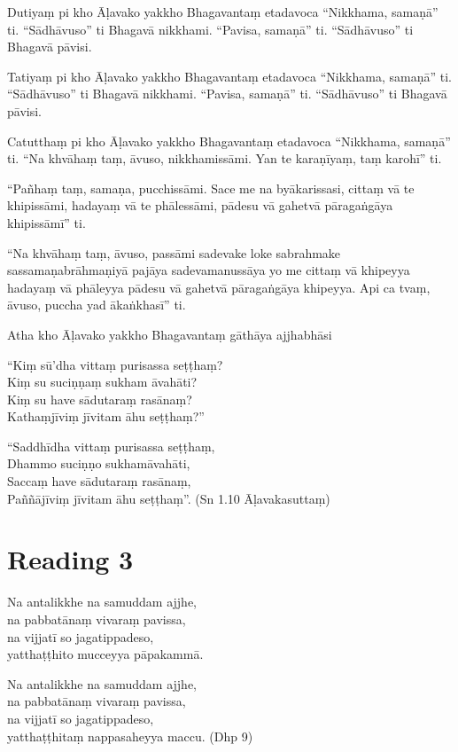 Dutiyaṃ pi kho Āḷavako yakkho Bhagavantaṃ etadavoca “Nikkhama, samaṇā” ti. “Sādhāvuso” ti Bhagavā nikkhami. “Pavisa, samaṇā” ti. “Sādhāvuso” ti Bhagavā pāvisi.

Tatiyaṃ pi kho Āḷavako yakkho Bhagavantaṃ etadavoca “Nikkhama, samaṇā” ti. “Sādhāvuso” ti Bhagavā nikkhami. “Pavisa, samaṇā” ti. “Sādhāvuso” ti Bhagavā pāvisi.

Catutthaṃ pi kho Āḷavako yakkho Bhagavantaṃ etadavoca “Nikkhama, samaṇā” ti. “Na khvāhaṃ taṃ, āvuso, nikkhamissāmi. Yan te karaṇīyaṃ, taṃ karohī” ti.

“Pañhaṃ taṃ, samaṇa, pucchissāmi. Sace me na byākarissasi, cittaṃ vā te khipissāmi, hadayaṃ vā te phālessāmi, pādesu vā gahetvā pāragaṅgāya khipissāmī” ti.

“Na khvāhaṃ taṃ, āvuso, passāmi sadevake loke sabrahmake sassamaṇabrāhmaṇiyā pajāya sadevamanussāya yo me cittaṃ vā khipeyya hadayaṃ vā phāleyya pādesu vā gahetvā pāragaṅgāya khipeyya. Api ca tvaṃ, āvuso, puccha yad ākaṅkhasī” ti.

Atha kho Āḷavako yakkho Bhagavantaṃ gāthāya ajjhabhāsi

“Kiṃ sū’dha vittaṃ purisassa seṭṭhaṃ?\\
Kiṃ su suciṇṇaṃ sukham āvahāti?\\
Kiṃ su have sādutaraṃ rasānaṃ?\\
Kathaṃjīviṃ jīvitam āhu seṭṭhaṃ?”

“Saddhīdha vittaṃ purisassa seṭṭhaṃ,\\
Dhammo suciṇṇo sukhamāvahāti,\\
Saccaṃ have sādutaraṃ rasānaṃ,\\
Paññājīviṃ jīvitam āhu seṭṭhaṃ”. \hfill(Sn 1.10 Āḷavakasuttaṃ)

\section*{Reading 3}

Na antalikkhe na samuddam ajjhe,\\
na pabbatānaṃ vivaraṃ pavissa,\\
na vijjatī so jagatippadeso,\\
yatthaṭṭhito mucceyya pāpakammā.

Na antalikkhe na samuddam ajjhe,\\
na pabbatānaṃ vivaraṃ pavissa,\\
na vijjatī so jagatippadeso,\\
yatthaṭṭhitaṃ nappasaheyya maccu. \hfill(Dhp 9)

